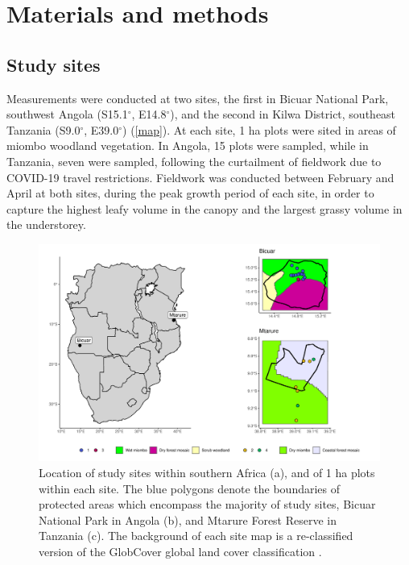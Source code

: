 \documentclass[11pt,a4paper]{article}
\begin{document}
\section{Materials and methods}

\subsection{Study sites}

Measurements were conducted at two sites, the first in Bicuar National Park, southwest Angola (S15.1$^\circ$, E14.8$^\circ$), and the second in Kilwa District, southeast Tanzania (S9.0$^\circ$, E39.0$^\circ$) (\autoref{map}). At each site, 1 ha plots were sited in areas of miombo woodland vegetation. In Angola, 15 plots were sampled, while in Tanzania, seven were sampled, following the curtailment of fieldwork due to COVID-19 travel restrictions. Fieldwork was conducted between February and April at both sites, during the peak growth period of each site, in order to capture the highest leafy volume in the canopy and the largest grassy volume in the understorey.

\begin{figure}[H]
\centering
	\includegraphics[width=\textwidth]{map}
	\caption{Location of study sites within southern Africa (a), and of 1 ha plots within each site. The blue polygons denote the boundaries of protected areas which encompass the majority of study sites, Bicuar National Park in Angola (b), and Mtarure Forest Reserve in Tanzania (c). The background of each site map is a re-classified version of the GlobCover global land cover classification \citep{Globcover}.}
	\label{map}
\end{figure}
\end{document}
